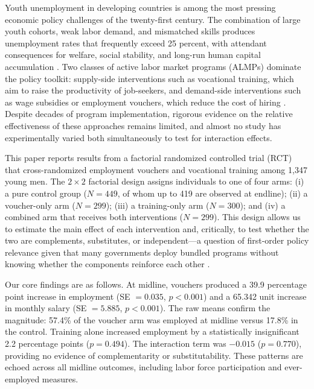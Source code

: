 \documentclass[12pt]{article}
\begin{document}
Youth unemployment in developing countries is among the most pressing economic policy challenges of the twenty-first century. The combination of large youth cohorts, weak labor demand, and mismatched skills produces unemployment rates that frequently exceed 25 percent, with attendant consequences for welfare, social stability, and long-run human capital accumulation \citep{assaad2017composition}. Two classes of active labor market programs (ALMPs) dominate the policy toolkit: supply-side interventions such as vocational training, which aim to raise the productivity of job-seekers, and demand-side interventions such as wage subsidies or employment vouchers, which reduce the cost of hiring \citep{heckman1999economics, card2018what}. Despite decades of program implementation, rigorous evidence on the relative effectiveness of these approaches remains limited, and almost no study has experimentally varied both simultaneously to test for interaction effects.

This paper reports results from a factorial randomized controlled trial (RCT) that cross-randomized employment vouchers and vocational training among 1,347 young men. The $2 \times 2$ factorial design assigns individuals to one of four arms: (i) a pure control group ($N = 449$, of whom up to 419 are observed at endline); (ii) a voucher-only arm ($N = 299$); (iii) a training-only arm ($N = 300$); and (iv) a combined arm that receives both interventions ($N = 299$). This design allows us to estimate the main effect of each intervention and, critically, to test whether the two are complements, substitutes, or independent---a question of first-order policy relevance given that many governments deploy bundled programs without knowing whether the components reinforce each other \citep{banerjee2015multifaceted, muralidharan2023factorial}.

Our core findings are as follows. At midline, vouchers produced a 39.9 percentage point increase in employment (SE $= 0.035$, $p < 0.001$) and a 65.342 unit increase in monthly salary (SE $= 5.885$, $p < 0.001$). The raw means confirm the magnitude: 57.4\% of the voucher arm was employed at midline versus 17.8\% in the control. Training alone increased employment by a statistically insignificant 2.2 percentage points ($p = 0.494$). The interaction term was $-0.015$ ($p = 0.770$), providing no evidence of complementarity or substitutability. These patterns are echoed across all midline outcomes, including labor force participation and ever-employed measures.
\end{document}
